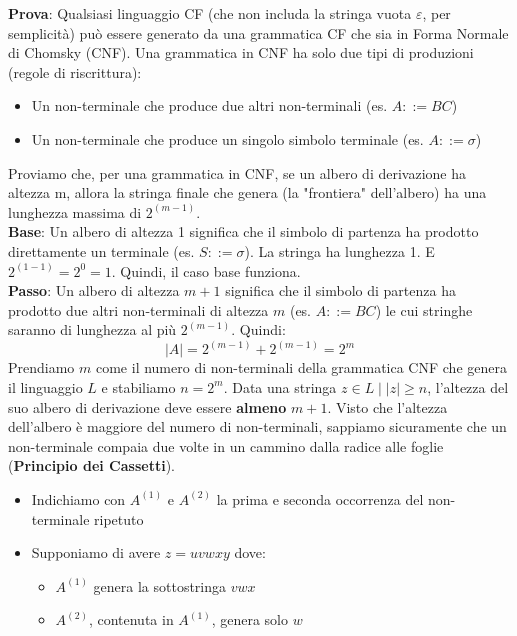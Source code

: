 \documentclass[12pt, a4paper]{report}
\begin{document}
            \begin{demonstration}
                \textbf{Prova}: Qualsiasi linguaggio CF (che non includa la stringa vuota $\varepsilon$, per semplicità) può essere generato da una grammatica CF che sia in Forma Normale di Chomsky (CNF). Una grammatica in CNF ha solo due tipi di produzioni (regole di riscrittura): \begin{itemize}
                    \item Un non-terminale che produce due altri non-terminali (es. $A ::= BC$)
                    \item Un non-terminale che produce un singolo simbolo terminale (es. $A ::= \sigma$)
                \end{itemize}
                Proviamo che, per una grammatica in CNF, se un albero di derivazione ha altezza m, allora la stringa finale che genera (la "frontiera" dell'albero) ha una lunghezza massima di $2^{(m-1)}$.\\
                \textbf{Base}: Un albero di altezza 1 significa che il simbolo di partenza ha prodotto direttamente un terminale (es. $S ::= \sigma$). La stringa ha lunghezza 1. E $2^{(1-1)} = 2^0 = 1$. Quindi, il caso base funziona.\\
                \textbf{Passo}: Un albero di altezza $m+1$ significa che il simbolo di partenza ha prodotto due altri non-terminali di altezza $m$ (es. $A::=BC$) le cui stringhe saranno di lunghezza al più $2^{(m-1)}$. Quindi: 
                $$|A|=2^{(m-1)} + 2^{(m-1)}=2^m$$
                Prendiamo $m$ come il numero di non-terminali della grammatica CNF che genera il linguaggio $L$ e stabiliamo $n=2^m$. Data una stringa $z\in L\mid|z|\geq n$, l'altezza del suo albero di derivazione deve essere \textbf{almeno} $m+1$. Visto che l'altezza dell'albero è maggiore del numero di non-terminali, sappiamo sicuramente che un non-terminale compaia due volte in un cammino dalla radice alle foglie (\textbf{Principio dei Cassetti}).
                \begin{itemize}
                    \item Indichiamo con $A^{(1)}$ e $A^{(2)}$ la prima e seconda occorrenza del non-terminale ripetuto
                    \item Supponiamo di avere $z=uvwxy$ dove: \begin{itemize}
                        \item $A^{(1)}$ genera la sottostringa $vwx$
                        \item $A^{(2)}$, contenuta in $A^{(1)}$, genera solo $w$

\end{itemize}
\end{itemize}
\end{demonstration}
\end{document}
